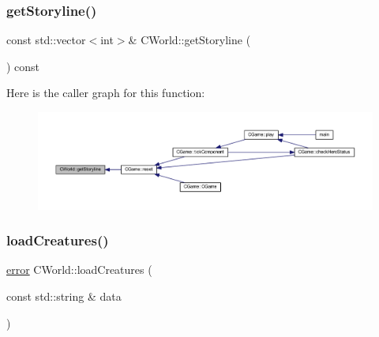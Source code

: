 \subsubsection{\texorpdfstring{get\+Storyline()}{getStoryline()}}
{\footnotesize\ttfamily const std\+::vector$<$int$>$\& C\+World\+::get\+Storyline (\begin{DoxyParamCaption}{ }\end{DoxyParamCaption}) const\hspace{0.3cm}{\ttfamily [inline]}}

Here is the caller graph for this function\+:\nopagebreak
\begin{figure}[H]
\begin{center}
\leavevmode
\includegraphics[width=350pt]{class_c_world_a72b79b6801a9e7ae670cc3790acf31d2_icgraph}
\end{center}
\end{figure}
\mbox{\label{class_c_world_a313cf7258bfab897ada813aa0f8837ac}} 
\subsubsection{\texorpdfstring{load\+Creatures()}{loadCreatures()}}
{\footnotesize\ttfamily \mbox{\hyperlink{_errors_list_8h_af10dacfa214e2575bb2e0ee407c242e0}{error}} C\+World\+::load\+Creatures (\begin{DoxyParamCaption}\item[{const std\+::string \&}]{data }\end{DoxyParamCaption})\hspace{0.3cm}{\ttfamily [protected]}}

